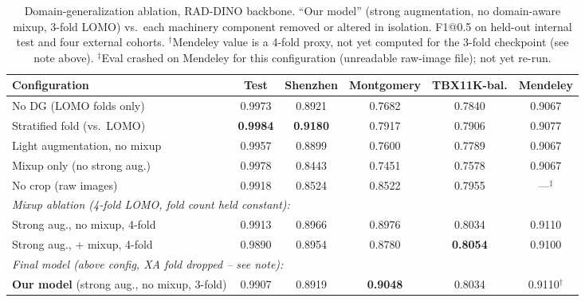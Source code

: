 \begin{table}[t]
\centering
\caption{Domain-generalization ablation, RAD-DINO backbone. ``Our model''
(strong augmentation, no domain-aware mixup, 3-fold LOMO) vs.\ each
machinery component removed or altered in isolation. F1@0.5 on held-out
internal test and four external cohorts. $^{\dagger}$Mendeley value is a
4-fold proxy, not yet computed for the 3-fold checkpoint (see note above).
$^{\ddagger}$Eval crashed on Mendeley for this configuration (unreadable
raw-image file); not yet re-run.}
\label{tab:dg-ablation}
\begin{tabular}{lccccc}
\toprule
Configuration & Test & Shenzhen & Montgomery & TBX11K-bal. & Mendeley \\
\midrule
No DG (LOMO folds only)         & 0.9973 & 0.8921 & 0.7682 & 0.7840 & 0.9067 \\
Stratified fold (vs.\ LOMO)     & \textbf{0.9984} & \textbf{0.9180} & 0.7917 & 0.7906 & 0.9077 \\
Light augmentation, no mixup    & 0.9957 & 0.8899 & 0.7600 & 0.7789 & 0.9067 \\
Mixup only (no strong aug.)     & 0.9978 & 0.8443 & 0.7451 & 0.7578 & 0.9067 \\
No crop (raw images)            & 0.9918 & 0.8524 & 0.8522 & 0.7955 & ---$^{\ddagger}$ \\
\midrule
\multicolumn{6}{l}{\emph{Mixup ablation (4-fold LOMO, fold count held constant):}} \\
Strong aug., no mixup, 4-fold   & 0.9913 & 0.8966 & 0.8976 & 0.8034 & 0.9110 \\
Strong aug., + mixup, 4-fold    & 0.9890 & 0.8954 & 0.8780 & \textbf{0.8054} & 0.9100 \\
\midrule
\multicolumn{6}{l}{\emph{Final model (above config, XA fold dropped -- see note):}} \\
\textbf{Our model} (strong aug., no mixup, 3-fold) & 0.9907 & 0.8919 & \textbf{0.9048} & 0.8034 & 0.9110$^{\dagger}$ \\
\bottomrule
\end{tabular}
\end{table}

